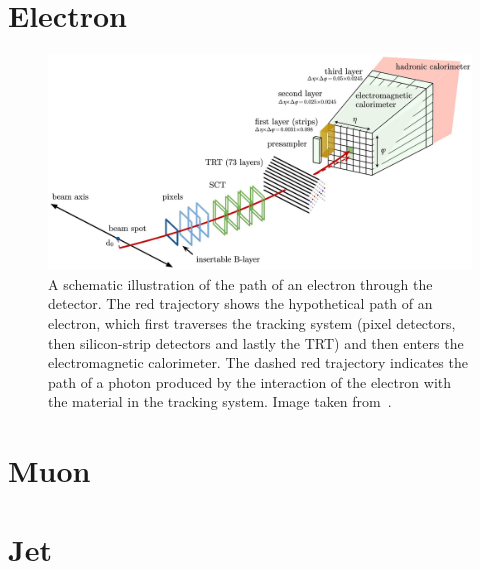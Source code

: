 \section{Electron}
\begin{figure}[bht]
    \begin{centering}	
    \includegraphics[width=.8\textwidth]{Reconstruction_plots/electron.jpg}
    \caption{A schematic illustration of the path of an electron through the detector. The red trajectory shows the
    hypothetical path of an electron, which first traverses the tracking system (pixel detectors, then silicon-strip detectors
    and lastly the TRT) and then enters the electromagnetic calorimeter. The dashed red trajectory indicates the path of a
    photon produced by the interaction of the electron with the material in the tracking system. Image taken from~\cite{PERF-2017-01}.
        }
    \label{fig:electron_recon}
    \end{centering}
\end{figure}
\section{Muon}
\section{Jet}
